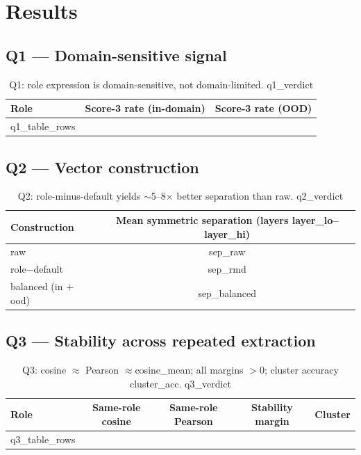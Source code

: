 \documentclass[11pt]{article}
\begin{document}
\section{Results}
\subsection{Q1 — Domain-sensitive signal}
\begin{table}[h]\centering
\begin{tabular}{lcc}\toprule
Role & Score-3 rate (in-domain) & Score-3 rate (OOD) \\ \midrule
{{q1\_table\_rows}} \\ \bottomrule
\end{tabular}\caption{Q1: role expression is domain-sensitive, not domain-limited. {{q1\_verdict}}}\end{table}

\subsection{Q2 — Vector construction}
\begin{table}[h]\centering
\begin{tabular}{lc}\toprule
Construction & Mean symmetric separation (layers {{layer\_lo}}--{{layer\_hi}}) \\ \midrule
raw & {{sep\_raw}} \\ role$-$default & {{sep\_rmd}} \\ balanced (in $+$ ood) & {{sep\_balanced}} \\ \bottomrule
\end{tabular}\caption{Q2: role-minus-default yields $\sim$5--8$\times$ better separation than raw. {{q2\_verdict}}}\end{table}

\subsection{Q3 — Stability across repeated extraction}
\begin{table}[h]\centering
\begin{tabular}{lcccc}\toprule
Role & Same-role cosine & Same-role Pearson & Stability margin & Cluster \\ \midrule
{{q3\_table\_rows}} \\ \bottomrule
\end{tabular}\caption{Q3: cosine $\approx$ Pearson $\approx${{cosine\_mean}}; all margins $>0$; cluster accuracy {{cluster\_acc}}. {{q3\_verdict}}}\end{table}
\end{document}
